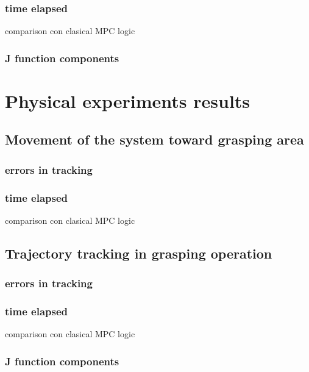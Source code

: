 		\subsubsection{time elapsed}
			comparison con clasical MPC logic
		\subsubsection{J function components}
	
\section{Physical experiments results}
	
	\subsection{Movement of the system toward grasping area}

		\subsubsection{errors in tracking}
			
		\subsubsection{time elapsed}
			comparison con clasical MPC logic

	\subsection{Trajectory tracking in grasping operation}

		\subsubsection{errors in tracking}
			
		\subsubsection{time elapsed}
			comparison con clasical MPC logic
		\subsubsection{J function components}
